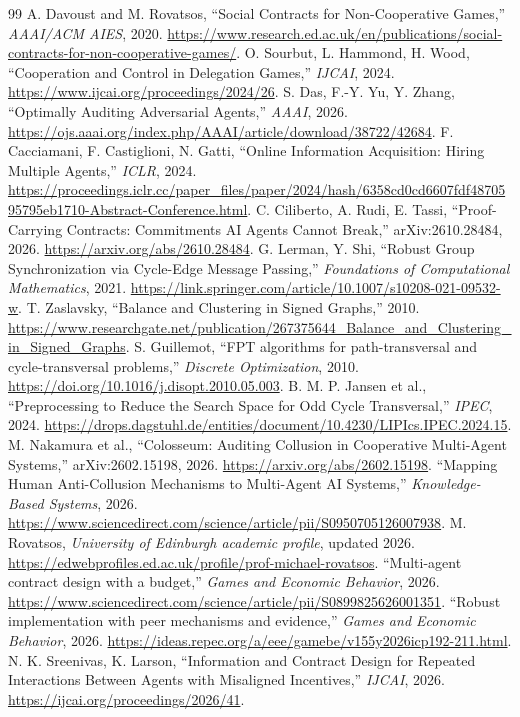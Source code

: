 \documentclass[10pt,a4paper]{article}
\theoremstyle{definition}\newtheorem{definition}[theorem]{Definition}
\begin{document}
\small
\begin{thebibliography}{99}
 A. Davoust and M. Rovatsos, ``Social Contracts for Non-Cooperative Games,'' \emph{AAAI/ACM AIES}, 2020. \url{https://www.research.ed.ac.uk/en/publications/social-contracts-for-non-cooperative-games/}.
 O. Sourbut, L. Hammond, H. Wood, ``Cooperation and Control in Delegation Games,'' \emph{IJCAI}, 2024. \url{https://www.ijcai.org/proceedings/2024/26}.
 S. Das, F.-Y. Yu, Y. Zhang, ``Optimally Auditing Adversarial Agents,'' \emph{AAAI}, 2026. \url{https://ojs.aaai.org/index.php/AAAI/article/download/38722/42684}.
 F. Cacciamani, F. Castiglioni, N. Gatti, ``Online Information Acquisition: Hiring Multiple Agents,'' \emph{ICLR}, 2024. \url{https://proceedings.iclr.cc/paper_files/paper/2024/hash/6358cd0cd6607fdf4870595795eb1710-Abstract-Conference.html}.
 C. Ciliberto, A. Rudi, E. Tassi, ``Proof-Carrying Contracts: Commitments AI Agents Cannot Break,'' arXiv:2610.28484, 2026. \url{https://arxiv.org/abs/2610.28484}.
 G. Lerman, Y. Shi, ``Robust Group Synchronization via Cycle-Edge Message Passing,'' \emph{Foundations of Computational Mathematics}, 2021. \url{https://link.springer.com/article/10.1007/s10208-021-09532-w}.
 T. Zaslavsky, ``Balance and Clustering in Signed Graphs,'' 2010. \url{https://www.researchgate.net/publication/267375644_Balance_and_Clustering_in_Signed_Graphs}.
 S. Guillemot, ``FPT algorithms for path-transversal and cycle-transversal problems,'' \emph{Discrete Optimization}, 2010. \url{https://doi.org/10.1016/j.disopt.2010.05.003}.
 B. M. P. Jansen et al., ``Preprocessing to Reduce the Search Space for Odd Cycle Transversal,'' \emph{IPEC}, 2024. \url{https://drops.dagstuhl.de/entities/document/10.4230/LIPIcs.IPEC.2024.15}.
 M. Nakamura et al., ``Colosseum: Auditing Collusion in Cooperative Multi-Agent Systems,'' arXiv:2602.15198, 2026. \url{https://arxiv.org/abs/2602.15198}.
 ``Mapping Human Anti-Collusion Mechanisms to Multi-Agent AI Systems,'' \emph{Knowledge-Based Systems}, 2026. \url{https://www.sciencedirect.com/science/article/pii/S0950705126007938}.
 M. Rovatsos, \emph{University of Edinburgh academic profile}, updated 2026. \url{https://edwebprofiles.ed.ac.uk/profile/prof-michael-rovatsos}.
 ``Multi-agent contract design with a budget,'' \emph{Games and Economic Behavior}, 2026. \url{https://www.sciencedirect.com/science/article/pii/S0899825626001351}.
 ``Robust implementation with peer mechanisms and evidence,'' \emph{Games and Economic Behavior}, 2026. \url{https://ideas.repec.org/a/eee/gamebe/v155y2026icp192-211.html}.
 N. K. Sreenivas, K. Larson, ``Information and Contract Design for Repeated Interactions Between Agents with Misaligned Incentives,'' \emph{IJCAI}, 2026. \url{https://ijcai.org/proceedings/2026/41}.
\end{thebibliography}
\end{document}
